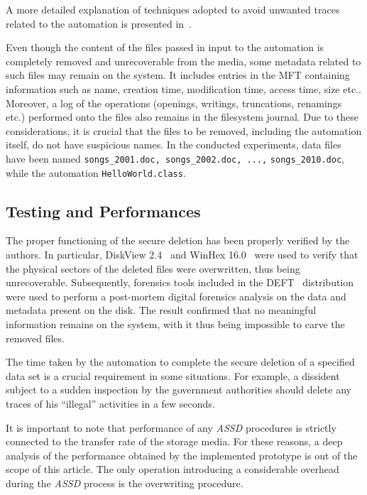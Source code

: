\documentclass[conference]{IEEEtran}
\newcommand{\assd}{\emph{ASSD}\xspace}
\begin{document}
\noindent A more detailed explanation of techniques adopted to avoid unwanted traces related to the automation is presented in~\cite{autoalibi}.

Even though the content of the files passed in input to the automation is completely removed and unrecoverable from the media, some metadata related to such files may remain on the system. It includes entries in the MFT containing information such as name, creation time, modification time, access time, size etc.. Moreover, a log of the operations (openings, writings, truncations, renamings etc.) performed onto the files also remains in the filesystem journal. Due to these considerations, it is crucial that the files to be removed, including the automation itself, do not have suspicious names.
In the conducted experiments, data files have been named \verb=songs_2001.doc, songs_2002.doc, ...,= \verb=songs_2010.doc=, while the automation \verb=HelloWorld.class=.


\subsection{Testing and Performances}

The proper functioning of the secure deletion has been properly verified by the authors.
In particular, DiskView 2.4~\cite{diskview} and WinHex 16.0~\cite{winhex} were used to verify that the physical sectors of the deleted files were overwritten, thus being unrecoverable. Subsequently, forensics tools included in the DEFT~\cite{deft} distribution were used to perform a post-mortem digital forensics analysis on the data and metadata present on the disk. The result confirmed that no meaningful information remains on the system, with it thus being impossible to carve the removed files.


\vspace{0.15cm}
The time taken by the automation to complete the secure deletion of a specified data set is a crucial requirement in some situations. For example, a dissident subject to a sudden inspection by the government authorities should delete any traces of his ``illegal'' activities in a few seconds.

It is important to note that performance of any \assd procedures is strictly connected to the transfer rate of the storage media.
For these reasons, a deep analysis of the performance obtained by the implemented prototype is out of the scope of this article. The only operation introducing a considerable overhead during the \assd process is the overwriting procedure.
\end{document}
